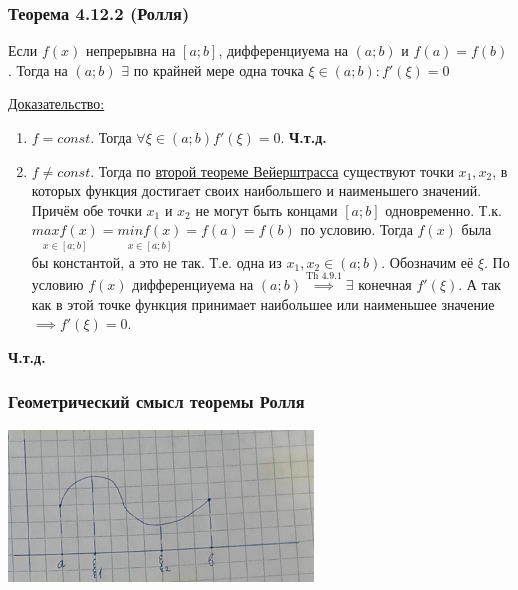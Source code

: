 \documentclass[12pt]{article}
\begin{document}
    \subsubsection*{Теорема 4.12.2 (Ролля)}\label{th:4.12.2}
    Если $f(x)$ непрерывна на $[a; b]$, дифференциуема на $(a; b)$ и $f(a) = f(b)$. Тогда на $(a;b)$ $\exists$ по крайней мере одна точка $\xi \in (a; b) : f'(\xi) = 0$\par\noindent
    \underline{Доказательство:}
    \begin{adjustwidth}{1.5em}{1.5em}
        \begin{enumerate}
            \item $f = const$. Тогда $\forall \xi \in (a; b) f'(\xi) = 0$. \textbf{Ч.т.д.}
            \item $f \ne const$. Тогда по \hyperref[th:3.8.2]{второй теореме Вейерштрасса} существуют точки $x_1, x_2$, в которых функция достигает своих наибольшего и наименьшего значений. Причём обе точки $x_1$ и $x_2$ не могут быть концами $[a;b]$ одновременно. Т.к. $\underset{x\in [a;b]}{max f(x)} = \underset{x\in [a;b]}{min f(x)} = f(a) = f(b)$ по условию. Тогда $f(x)$ была бы константой, а это не так. Т.е. одна из $x_1, x_2 \in (a;b)$. Обозначим её $\xi$. По условию $f(x)$ дифференциуема на $(a;b) \overset{\hyperref[th:4.9.1]{\text{Th 4.9.1}}}{\implies} \exists$ конечная $f'(\xi)$. А так как в этой точке функция принимает наибольшее или наименьшее значение $\implies f'(\xi) = 0$.
        \end{enumerate}
        \begin{center}
            \textbf{Ч.т.д.}
        \end{center}
    \end{adjustwidth}

    \subsubsection*{Геометрический смысл теоремы Ролля}
    \begin{center}
        \includegraphics{4.12.1}
    \end{center}
\end{document}
